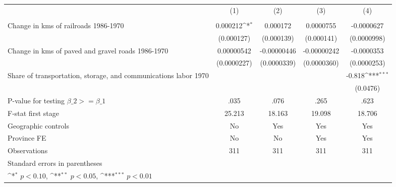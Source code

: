 {
\def\sym#1{\ifmmode^{#1}\else\(^{#1}\)\fi}
\begin{tabular}{l*{4}{c}}
\hline\hline
                &\multicolumn{1}{c}{(1)}&\multicolumn{1}{c}{(2)}&\multicolumn{1}{c}{(3)}&\multicolumn{1}{c}{(4)}\\
                &\multicolumn{1}{c}{}&\multicolumn{1}{c}{}&\multicolumn{1}{c}{}&\multicolumn{1}{c}{}\\
\hline
Change in kms of railroads 1986-1970& 0.000212\sym{*}  & 0.000172         &0.0000755         &-0.0000627         \\
                &(0.000127)         &(0.000139)         &(0.000141)         &(0.0000998)         \\
[1em]
Change in kms of paved and gravel roads 1986-1970&0.00000542         &-0.00000446         &-0.00000242         &-0.0000353         \\
                &(0.0000227)         &(0.0000339)         &(0.0000360)         &(0.0000253)         \\
[1em]
Share of transportation, storage, and communications labor 1970&                  &                  &                  &   -0.818\sym{***}\\
                &                  &                  &                  & (0.0476)         \\
\hline
P-value for testing $\beta\_{2} >= \beta\_{1}$&     .035         &     .076         &     .265         &     .623         \\
F-stat first stage&   25.213         &   18.163         &   19.098         &   18.706         \\
Geographic controls&       No         &      Yes         &      Yes         &      Yes         \\
Province FE     &       No         &       No         &      Yes         &      Yes         \\
Observations    &      311         &      311         &      311         &      311         \\
\hline\hline
\multicolumn{5}{l}{\footnotesize Standard errors in parentheses}\\
\multicolumn{5}{l}{\footnotesize \sym{*} \(p<0.10\), \sym{**} \(p<0.05\), \sym{***} \(p<0.01\)}\\
\end{tabular}
}
